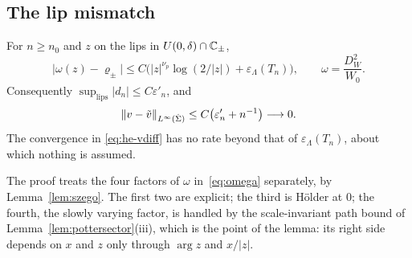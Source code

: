 \subsection{The lip mismatch}\label{sec:he-mismatch}

\begin{lemma}\label{lem:lip-mismatch}
For $n\ge n_0$ and $z$ on the lips in $U(0,\delta)\cap\mathbb{C}_\pm$,
\begin{equation}\label{eq:he-mismatch}
  \bigl|\omega(z)-\varrho_\pm\bigr|\le C\bigl(|z|^{\nu_p}\log(2/|z|)+\varepsilon_\Lambda(T_n)\bigr),\qquad \omega=\frac{D_W^2}{W_0}.
\end{equation}
Consequently $\sup_{\mathrm{lips}}|d_n|\le C\varepsilon'_n$, and
\begin{equation}\label{eq:he-vdiff}
  \|v-\tilde v\|_{L^\infty(\hat\Sigma)}\le C\bigl(\varepsilon'_n+n^{-1}\bigr)\longrightarrow0 .
\end{equation}
The convergence in \eqref{eq:he-vdiff} has no rate beyond that of $\varepsilon_\Lambda(T_n)$, about which nothing is
assumed.
\end{lemma}

The proof treats the four factors of $\omega$ in~\eqref{eq:omega} separately, by Lemma~\ref{lem:szego}. The first two
are explicit; the third is H\"older at $0$; the fourth, the slowly varying factor, is handled by the scale-invariant
path bound of Lemma~\ref{lem:pottersector}(iii), which is the point of the lemma: its right side depends on $x$ and $z$
only through $\arg z$ and $x/|z|$.


